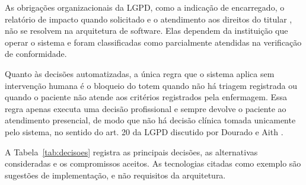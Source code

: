 As obrigações organizacionais da LGPD, como a indicação de encarregado, o relatório de impacto quando solicitado e o atendimento aos direitos do titular \cite{lgpd2018}, não se resolvem na arquitetura de software. Elas dependem da instituição que operar o sistema e foram classificadas como parcialmente atendidas na verificação de conformidade.

Quanto às decisões automatizadas, a única regra que o sistema aplica sem intervenção humana é o bloqueio do totem quando não há triagem registrada ou quando o paciente não atende aos critérios registrados pela enfermagem. Essa regra apenas executa uma decisão profissional e sempre devolve o paciente ao atendimento presencial, de modo que não há decisão clínica tomada unicamente pelo sistema, no sentido do art. 20 da LGPD discutido por Dourado e Aith \cite{dourado2022}.

\label{sec:res-decisoes}

A Tabela~\ref{tab:decisoes} registra as principais decisões, as alternativas consideradas e os compromissos aceitos. As tecnologias citadas como exemplo são sugestões de implementação, e não requisitos da arquitetura.

